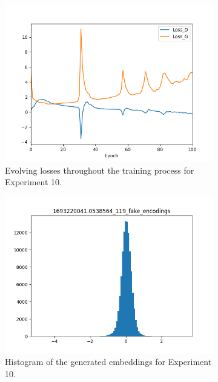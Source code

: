 \begin{figure}[!ht]
    \centering
    \begin{subfigure}{0.3\textwidth}
        \includegraphics[width=\textwidth]{figures/4.5-results/exp10_loss.png}
        \caption{Evolving losses throughout the training process for Experiment 10.}
        \label{fig:exp10_loss}
    \end{subfigure}
    \begin{subfigure}{0.3\textwidth}
        \includegraphics[width=\textwidth]{figures/4.5-results/exp10_hist.png}
        \caption{Histogram of the generated embeddings for Experiment 10.}
        \label{fig:exp10_hist}
    \end{subfigure}
    \begin{subfigure}{0.3\textwidth}

\end{subfigure}
\end{figure}
